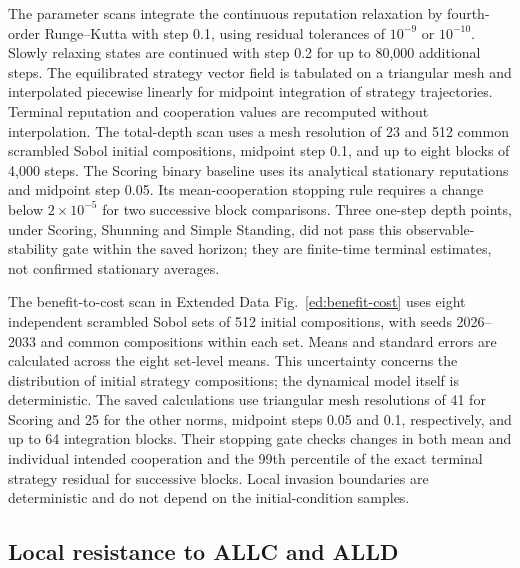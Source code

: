\documentclass[fleqn,10pt]{article}
\begin{document}
The parameter scans integrate the continuous reputation relaxation by fourth-order Runge--Kutta with step 0.1, using residual tolerances of $10^{-9}$ or $10^{-10}$. Slowly relaxing states are continued with step 0.2 for up to 80,000 additional steps. The equilibrated strategy vector field is tabulated on a triangular mesh and interpolated piecewise linearly for midpoint integration of strategy trajectories. Terminal reputation and cooperation values are recomputed without interpolation. The total-depth scan uses a mesh resolution of 23 and 512 common scrambled Sobol initial compositions, midpoint step 0.1, and up to eight blocks of 4,000 steps. The Scoring binary baseline uses its analytical stationary reputations and midpoint step 0.05. Its mean-cooperation stopping rule requires a change below $2\times10^{-5}$ for two successive block comparisons. Three one-step depth points, under Scoring, Shunning and Simple Standing, did not pass this observable-stability gate within the saved horizon; they are finite-time terminal estimates, not confirmed stationary averages.

The benefit-to-cost scan in Extended Data Fig.~\ref{ed:benefit-cost} uses eight independent scrambled Sobol sets of 512 initial compositions, with seeds 2026--2033 and common compositions within each set. Means and standard errors are calculated across the eight set-level means. This uncertainty concerns the distribution of initial strategy compositions; the dynamical model itself is deterministic. The saved calculations use triangular mesh resolutions of 41 for Scoring and 25 for the other norms, midpoint steps 0.05 and 0.1, respectively, and up to 64 integration blocks. Their stopping gate checks changes in both mean and individual intended cooperation and the 99th percentile of the exact terminal strategy residual for successive blocks. Local invasion boundaries are deterministic and do not depend on the initial-condition samples.

\subsection*{Local resistance to ALLC and ALLD}
\end{document}
